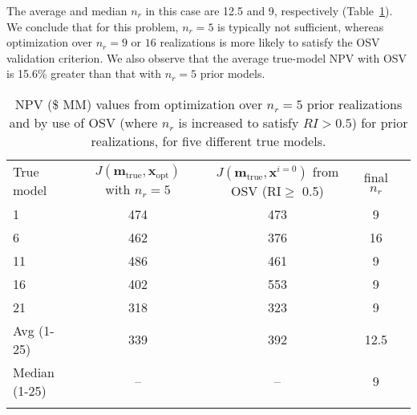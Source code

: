 \documentclass[11pt]{article}
\begin{document}
%
The average and median $n_r$ in this case are 12.5 and 9, respectively (Table~\ref{tab:osv-pr}).
We conclude that for this problem,
$n_r=5$ is typically not sufficient, whereas optimization over $n_r=9$ or $16$ realizations is more likely to satisfy the OSV validation criterion.
We also observe that the average true-model NPV with OSV is 15.6\% greater than that with $n_r=5$ prior models.



\begin{table}
\centering \caption{
NPV (\$ MM) values from optimization over $n_r = 5$ prior realizations and by use of OSV (where $n_r$ is increased
to satisfy $RI>0.5$) for prior realizations, for five different true models.
}\label{tab:osv-pr}
\begin{tabular}{lcccc}
  \hline
True model & $J(\mathbf{m}_{\text{true}},\mathbf{x}_{\text{opt}})$ with $n_r=5$ & $J(\mathbf{m}_{\text{true}},\mathbf{x}^{i=0})$ from OSV (RI$\ge$ 0.5) & final $n_r$ \\
\noalign{\smallskip} \hline\noalign{\smallskip}
1	& 474	& 473	& 9 \\
6	& 462	& 376	& 16 \\
11	& 486	& 461	& 9 \\
16	& 402	& 553	& 9 \\
21	& 318	& 323	& 9 \\
Avg (1-25)   & 339  & 392  & 12.5\\
Median (1-25) & -- & -- &   9 \\
\hline\noalign{\smallskip}
\noalign{\smallskip}%
\end{tabular}
\end{table}
\end{document}
